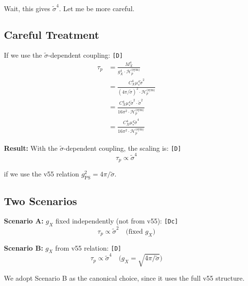\documentclass[11pt,a4paper]{article}
\newcommand{\tagD}{\textcolor{green!50!black}{\texttt{[D]}}}
\newcommand{\tagDc}{\textcolor{blue!70!black}{\texttt{[Dc]}}}
\theoremstyle{definition}
\begin{document}
Wait, this gives $\tilde{\sigma}^4$. Let me be more careful.

\subsection{Careful Treatment}
\label{subsec:careful-treatment}

If we use the $\tilde{\sigma}$-dependent coupling: \tagD{}
\begin{align}
\label{eq:careful-1}
\tau_p &= \frac{M_X^4}{g_X^4 \cdot \mathcal{H}_p^{\text{(sym)}}} \\
\label{eq:careful-2}
&= \frac{C_X^4 \mu_*^4 \tilde{\sigma}^2}{(4\pi/\tilde{\sigma})^2 \cdot \mathcal{H}_p^{\text{(sym)}}} \\
\label{eq:careful-3}
&= \frac{C_X^4 \mu_*^4 \tilde{\sigma}^2 \cdot \tilde{\sigma}^2}{16\pi^2 \cdot \mathcal{H}_p^{\text{(sym)}}} \\
\label{eq:careful-4}
&= \frac{C_X^4 \mu_*^4 \tilde{\sigma}^4}{16\pi^2 \cdot \mathcal{H}_p^{\text{(sym)}}}
\end{align}

\textbf{Result:} With the $\tilde{\sigma}$-dependent coupling, the scaling is: \tagD{}
\begin{equation}
\label{eq:sigma-fourth-scaling}
\boxed{\tau_p \propto \tilde{\sigma}^4}
\end{equation}

if we use the v55 relation $g_{\text{PS}}^2 = 4\pi/\tilde{\sigma}$.

\subsection{Two Scenarios}
\label{subsec:two-scenarios}

\textbf{Scenario A:} $g_X$ fixed independently (not from v55): \tagDc{}
\begin{equation}
\label{eq:scenario-a}
\tau_p \propto \tilde{\sigma}^2 \quad \text{(fixed } g_X \text{)}
\end{equation}

\textbf{Scenario B:} $g_X$ from v55 relation: \tagD{}
\begin{equation}
\label{eq:scenario-b}
\tau_p \propto \tilde{\sigma}^4 \quad \text{(} g_X = \sqrt{4\pi/\tilde{\sigma}} \text{)}
\end{equation}

We adopt Scenario B as the canonical choice, since it uses the full v55 structure.

\end{document}
